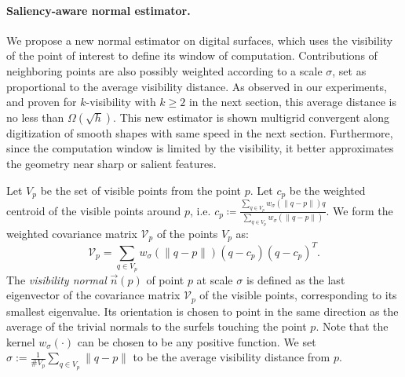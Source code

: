 \newcommand{\Kernel}[1]{\ensuremath{w_{\sigma}(#1)}}

\paragraph{Saliency-aware normal estimator.}

We propose a new normal estimator on digital surfaces,
which uses the visibility of the point of interest to define its
window of computation. Contributions of neighboring points are also
possibly weighted according to a scale $\sigma$, set as proportional
to the average visibility distance. As observed in our experiments,
and proven for $k$-visibility with $k \ge 2$ in the next section,
this average distance is no less than $\Omega(\sqrt{h})$. This new
estimator is shown multigrid convergent along digitization of smooth
shapes with same speed in the next section. Furthermore, since the
computation window is limited by the visibility, it better
approximates the geometry near sharp or salient features.

Let $V_p$ be the set of visible points from the point $p$.
Let $c_p$ be the weighted centroid of the visible points around $p$,
i.e. $c_p \coloneqq \frac{\sum_{q \in V_p} \Kernel{\|q-p\|}q}{\sum_{q \in
V_p} \Kernel{\|q-p\|}}$. We form the weighted covariance matrix
$\mathcal{V}_p$ of the points $V_p$ as:
\begin{equation}
    \mathcal{V}_p = \sum_{q \in V_p} \Kernel{\|q-p\|}(q - c_p)(q - c_p)^T.
\end{equation}
The \emph{visibility normal} $\vec{n}(p)$ of point $p$ at scale
$\sigma$ is defined as the last eigenvector of the covariance matrix
$\mathcal{V}_p$ of the visible points, corresponding to its smallest
eigenvalue. Its orientation is chosen to point in the same direction
as the average of the trivial normals to the surfels touching the
point $p$. Note that the kernel $\Kernel{\cdot}$ can be chosen to be
any positive function. We set $\sigma := \frac{1}{\#
    V_p}\sum_{q \in V_p} \|q-p\|$ to be the average visibility
  distance from $p$.

